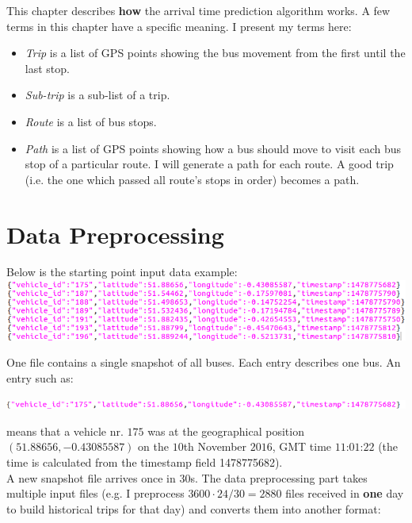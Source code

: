 \documentclass[12pt,a4paper,oneside,openright]{report}
\begin{document}
This chapter describes \textbf{how} the arrival time prediction algorithm works. A few terms in this chapter have a specific
meaning. I present my terms here:

\begin{itemize}

\item \textit{Trip} is a list of GPS points showing the bus movement from the first until the last stop.
\item \textit{Sub-trip} is a sub-list of a trip.
\item \textit{Route} is a list of bus stops.
\item \textit{Path} is a list of GPS points showing how a bus should move to visit each bus stop of a particular route. I will
generate a path for each route. A good trip (i.e. the one which passed all route's stops in order) becomes a path.

\end{itemize}

\section{Data Preprocessing}

\label{3.1}

Below is the starting point input data example: \\
\includegraphics[scale=0.6]{figs/starting_data.png}

One file contains a single snapshot of all buses. Each entry describes one bus. An entry such as:

\includegraphics[width=\textwidth]{figs/entry.png}

means that a vehicle nr. $175$ was at the geographical position
$(51.88656, -0.43085587)$ on the $10$th November $2016$, GMT time
$11$:$01$:$22$ (the time is calculated from the timestamp field 1478775682). \\

A new snapshot file arrives once in $30$s. The data preprocessing part
takes multiple input files (e.g. I preprocess $3600 \cdot 24 / 30 = 2880$ files
received in \textbf{one} day to build historical trips for that day) and converts them
into another format: 
\end{document}
